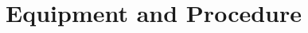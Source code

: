 \documentclass[12pt]{article}
\begin{document}
\subsection{}
\label{subsec:}

\subsubsection{}
\label{subsubsec:}



\subsubsection{}
\label{subsubsec:}



\subsubsection{}
\label{subsubsec:}



\subsection{}
\label{subsec:}



\subsection{}
\label{subsec:}



\subsubsection{}
\label{subsubsec:}



\subsubsection{}
\label{subsubsec:}



\subsubsection{}
\label{subsubsec:}



\section{Equipment and Procedure}
\end{document}
